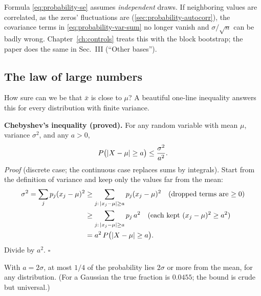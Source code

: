 \begin{pitfall}
Formula \cref{eq:probability-se} assumes \emph{independent} draws. If neighboring values are correlated, as the zeros' fluctuations are (\cref{sec:probability-autocorr}), the covariance terms in \cref{eq:probability-var-sum} no longer vanish and $\sigma/\sqrt n$ can be badly wrong. Chapter~\ref{ch:controls} treats this with the block bootstrap; the paper does the same in Sec.~III (``Other bases'').
\end{pitfall}

\subsection{The law of large numbers}

How sure can we be that $\bar x$ is close to $\mu$? A beautiful one-line inequality answers this for every distribution with finite variance.

\textbf{Chebyshev's inequality (proved).} For any random variable with mean $\mu$, variance $\sigma^2$, and any $a>0$,
\begin{equation}
P\bigl(\left\lvert X-\mu\right\rvert\ge a\bigr)\le\frac{\sigma^2}{a^2}.
\label{eq:probability-chebyshev}
\end{equation}
\emph{Proof} (discrete case; the continuous case replaces sums by integrals). Start from the definition of variance and keep only the values far from the mean:
\begin{align*}
\sigma^2=\sum_j p_j(x_j-\mu)^2 &\ge \sum_{j:\,\left\lvert x_j-\mu\right\rvert\ge a}p_j(x_j-\mu)^2 \quad\text{(dropped terms are $\ge0$)}\\
&\ge \sum_{j:\,\left\lvert x_j-\mu\right\rvert\ge a}p_j\,a^2 \quad\text{(each kept $(x_j-\mu)^2\ge a^2$)}\\
&= a^2\,P\bigl(\left\lvert X-\mu\right\rvert\ge a\bigr).
\end{align*}
Divide by $a^2$. \hfill$\square$

With $a=2\sigma$, at most $1/4$ of the probability lies $2\sigma$ or more from the mean, for any distribution. (For a Gaussian the true fraction is $0.0455$; the bound is crude but universal.)

